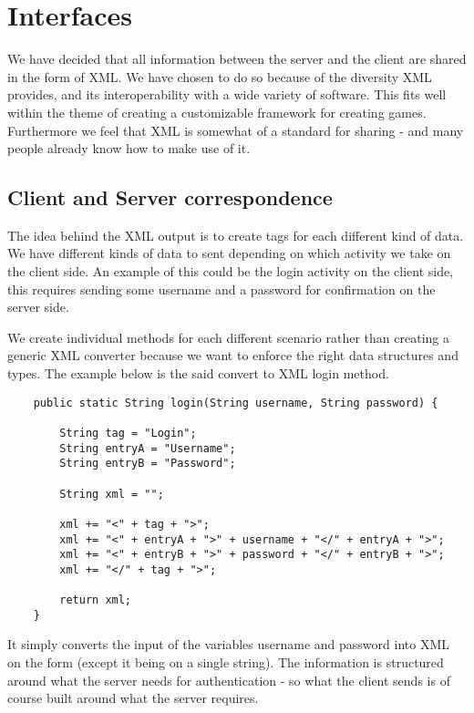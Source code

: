 \section{Interfaces}

We have decided that all information between the server and the client are shared in the form of XML. We have chosen to do so because of the diversity XML provides, and its interoperability with a wide variety of software. This fits well within the theme of creating a customizable framework for creating games. Furthermore we feel that XML is somewhat of a standard for sharing - and many people already know how to make use of it.

\subsection{Client and Server correspondence}

The idea behind the XML output is to create tags for each different kind of data. We have different kinds of data to sent depending on which activity we take on the client side. An example of this could be the login activity on the client side, this requires sending some username and a password for confirmation on the server side.

We create individual methods for each different scenario rather than creating a generic XML converter because we want to enforce the right data structures and types. The example below is the said convert to XML login method. 

\begin{lstlisting}
    public static String login(String username, String password) {

        String tag = "Login";
        String entryA = "Username";
        String entryB = "Password";

        String xml = "";

        xml += "<" + tag + ">";
        xml += "<" + entryA + ">" + username + "</" + entryA + ">";
        xml += "<" + entryB + ">" + password + "</" + entryB + ">";
        xml += "</" + tag + ">";

        return xml;
    }
\end{lstlisting}

It simply converts the input of the variables username and password into XML on the form (except it being on a single string). The information is structured around what the server needs for authentication - so what the client sends is of course built around what the server requires.

